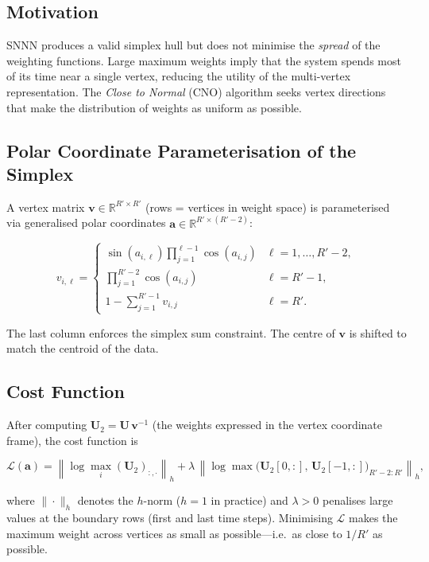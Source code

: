 \documentclass[11pt]{article}
\theoremstyle{definition}
\theoremstyle{plain}
\newcommand{\R}{\mathbb{R}}
\newcommand{\mat}[1]{\mathbf{#1}}
\newcommand{\norm}[1]{\left\|#1\right\|}
\begin{document}
\subsection{Motivation}

SNNN produces a valid simplex hull but does not minimise the
\emph{spread} of the weighting functions.  Large maximum weights imply
that the system spends most of its time near a single vertex, reducing
the utility of the multi-vertex representation.  The \emph{Close to
Normal} (CNO) algorithm seeks vertex directions that make the
distribution of weights as uniform as possible.

\subsection{Polar Coordinate Parameterisation of the Simplex}

A vertex matrix $\mat{v} \in \R^{R' \times R'}$ (rows = vertices in
weight space) is parameterised via generalised polar coordinates
$\mat{a} \in \R^{R' \times (R'-2)}$:

\begin{equation}
  v_{i,\ell} =
  \begin{cases}
    \sin(a_{i,\ell})\prod_{j=1}^{\ell-1}\cos(a_{i,j}) & \ell = 1,\ldots,R'-2, \\[4pt]
    \prod_{j=1}^{R'-2}\cos(a_{i,j}) & \ell = R'-1, \\[4pt]
    1 - \sum_{j=1}^{R'-1}v_{i,j} & \ell = R'.
  \end{cases}
  \label{eq:polar}
\end{equation}

The last column enforces the simplex sum constraint.  The centre of
$\mat{v}$ is shifted to match the centroid of the data.

\subsection{Cost Function}

After computing $\mat{U}_2 = \mat{U}\,\mat{v}^{-1}$ (the weights
expressed in the vertex coordinate frame), the cost function is

\begin{equation}
  \mathcal{L}(\mat{a}) =
  \norm{\log\max_i(\mat{U}_2)_{:,\cdot}}_h
  + \lambda\,\norm{\log\max\!\bigl(\mat{U}_2[0,:],\,\mat{U}_2[-1,:]\bigr)_{R'-2:R'}}_h,
  \label{eq:cno_cost}
\end{equation}

where $\|\cdot\|_h$ denotes the $h$-norm ($h=1$ in practice) and
$\lambda > 0$ penalises large values at the boundary rows (first and
last time steps).  Minimising $\mathcal{L}$ makes the maximum weight
across vertices as small as possible---i.e.\ as close to $1/R'$ as possible.
\end{document}
